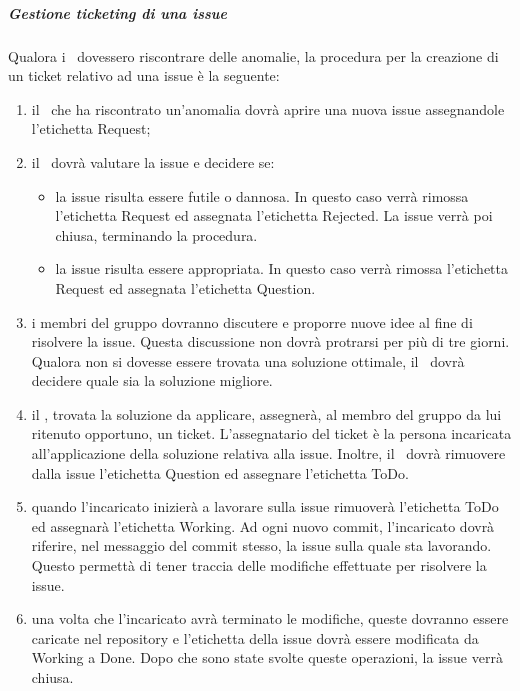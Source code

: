 \documentclass[../NormeProgetto.tex]{subfiles}
\begin{document}
		\subparagraph{Gestione ticketing di una issue}
		Qualora i \verificatori\ dovessero riscontrare delle anomalie, la procedura per la creazione di un ticket relativo ad una issue è la seguente:
		\begin{enumerate}
			\item il \verificatore\ che ha riscontrato un'anomalia dovrà aprire una nuova issue assegnandole l'etichetta Request;
			\item il \responsabilediprogetto\ dovrà valutare la issue e decidere se:			\begin{itemize}
				\item la issue risulta essere futile o dannosa. In questo caso verrà rimossa l'etichetta Request ed assegnata l'etichetta Rejected. La issue verrà poi chiusa, terminando la procedura.
				\item la issue risulta essere appropriata. In questo caso verrà rimossa l'etichetta Request ed assegnata l'etichetta Question. 
			\end{itemize}
			\item i membri del gruppo dovranno discutere e proporre nuove idee al fine di risolvere la issue. Questa discussione non dovrà protrarsi per più di tre giorni. Qualora non si dovesse essere trovata una soluzione ottimale, il \responsabilediprogetto\ dovrà decidere quale sia la soluzione migliore.
			\item il \responsabilediprogetto, trovata la soluzione da applicare,  assegnerà, al membro del gruppo da lui ritenuto opportuno, un ticket. L'assegnatario del ticket è la persona incaricata all'applicazione della soluzione relativa alla issue. Inoltre, il \responsabilediprogetto\ dovrà rimuovere dalla issue l'etichetta Question ed assegnare l'etichetta ToDo.
			\item quando l'incaricato inizierà a lavorare sulla issue rimuoverà l'etichetta ToDo ed assegnarà l'etichetta Working. Ad ogni nuovo commit, l'incaricato dovrà riferire, nel messaggio del commit stesso, la issue sulla quale sta lavorando. Questo permettà di tener traccia delle modifiche effettuate per risolvere la issue.
			\item una volta che l'incaricato avrà terminato le modifiche, queste dovranno essere caricate nel repository e l'etichetta della issue dovrà essere modificata da Working a Done. Dopo che sono state svolte queste operazioni, la issue verrà chiusa.
		\end{enumerate}
		
\end{document}
